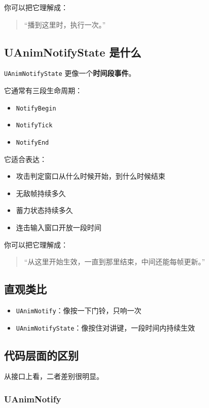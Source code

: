 你可以把它理解成：

\begin{quote}
	“播到这里时，执行一次。”
\end{quote}

\subsection{UAnimNotifyState 是什么}

\verb|UAnimNotifyState| 更像一个\textbf{时间段事件}。

它通常有三段生命周期：

\begin{itemize}
	\item \verb|NotifyBegin|
	\item \verb|NotifyTick|
	\item \verb|NotifyEnd|
\end{itemize}

它适合表达：

\begin{itemize}
	\item 攻击判定窗口从什么时候开始，到什么时候结束
	\item 无敌帧持续多久
	\item 蓄力状态持续多久
	\item 连击输入窗口开放一段时间
\end{itemize}

你可以把它理解成：

\begin{quote}
	“从这里开始生效，一直到那里结束，中间还能每帧更新。”
\end{quote}

\subsection{直观类比}

\begin{itemize}
	\item \verb|UAnimNotify|：像按一下门铃，只响一次
	\item \verb|UAnimNotifyState|：像按住对讲键，一段时间内持续生效
\end{itemize}

\subsection{代码层面的区别}

从接口上看，二者差别很明显。

\subsubsection{UAnimNotify}

